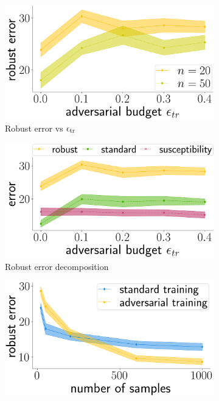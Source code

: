 
\begin{figure}[!t]
\centering
\begin{subfigure}[b]{0.33\textwidth}
  \includegraphics[width=0.99\linewidth]{plotsAistats/d_n_waterbirds_light.png}
  \caption{Robust error vs $\epsilon_{\text{tr}}$}
  \label{fig:waterbirds_light_d_n}
\end{subfigure}
\begin{subfigure}[b]{0.32\textwidth}
  \includegraphics[width=0.99\linewidth]{plotsAistats/waterbirds_light_decomposition.png}
  \caption{Robust error decomposition}
  \label{fig:light_trade_off}
\end{subfigure}
\begin{subfigure}[b]{0.33\textwidth}
  \includegraphics[width=0.99\linewidth]{plotsAistats/numsamp_waterbirds_light.png}

\end{subfigure}
\end{figure}
